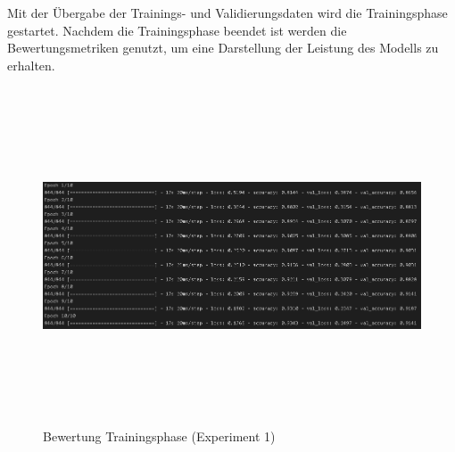 \documentclass[12pt]{scrreprt}
\begin{document}
Mit der Übergabe der Trainings- und Validierungsdaten wird die Trainingsphase gestartet. Nachdem die Trainingsphase beendet ist werden die Bewertungsmetriken genutzt, um eine Darstellung der Leistung des Modells zu erhalten.
	
\begin{figure}[h!]
	\centering
	\includegraphics[width=14cm, height=10cm]		{ExperimentModelTrainingsphase_1.png}
	\caption{ Bewertung Trainingsphase \cite{HK22}(Experiment 1)}
	\label{fig:fig14}
\end{figure}
	
\end{document}
